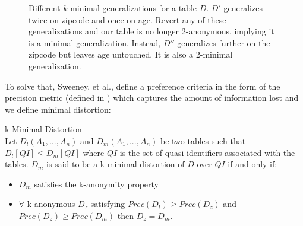 \begin{figure}
    \centering
    \caption{Different $k$-minimal generalizations for a table $D$. $D'$ generalizes twice on zipcode and once on age. Revert any of these generalizations and our table is no longer $2$-anonymous, implying it is a minimal generalization. Instead, $D''$ generalizes further on the zipcode but leaves age untouched. It is also a $2$-minimal generalization.}
    \label{fig:kminimal_gen_tables}
\end{figure}

To solve that, Sweeney, et al., define a preference criteria in the form of the precision metric (defined in ) which captures the amount of information lost and we define minimal distortion:

\begin{definition}{k-Minimal Distortion} \\
Let $D_l(A_1,...,A_n)$ and $D_m(A_1,...,A_n)$ be two tables such that $D_l[QI] \leq D_m[QI]$ where $QI$ is the set of quasi-identifiers associated with the tables. $D_m$ is said to be a k-minimal distortion of $D$ over $QI$ if and only if:
\begin{itemize}
    \item $D_m$ satisfies the k-anonymity property
    \item $\forall$ k-anonymous $D_z$ satisfying $Prec(D_l) \geq Prec(D_z)$ and $Prec(D_z) \geq Prec(D_m)$ then $D_z = D_m$. 
\end{itemize}
\end{definition}


